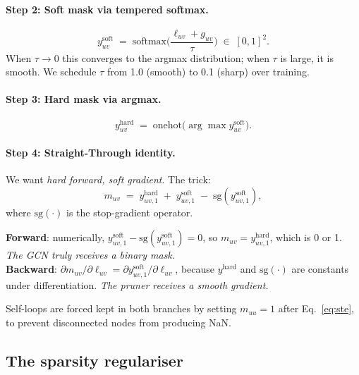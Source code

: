 \documentclass[11pt,a4paper]{article}
\begin{document}
\paragraph{Step 2: Soft mask via tempered softmax.}
\begin{equation}
y^{\text{soft}}_{uv} \;=\; \mathrm{softmax}\!\Bigg(\frac{\ell_{uv} + g_{uv}}{\tau}\Bigg)
\;\in\; [0,1]^{2}.
\label{eq:ysoft}
\end{equation}
When $\tau \to 0$ this converges to the argmax distribution; when
$\tau$ is large, it is smooth. We schedule $\tau$ from 1.0 (smooth) to
0.1 (sharp) over training.

\paragraph{Step 3: Hard mask via argmax.}
\begin{equation}
y^{\text{hard}}_{uv} \;=\; \mathrm{onehot}\!\big(\arg\max y^{\text{soft}}_{uv}\big).
\label{eq:yhard}
\end{equation}

\paragraph{Step 4: Straight-Through identity.}
We want \emph{hard forward, soft gradient}. The trick:
\begin{equation}
m_{uv} \;=\; y^{\text{hard}}_{uv,1}
\;+\; y^{\text{soft}}_{uv,1}
\;-\; \mathrm{sg}(y^{\text{soft}}_{uv,1}),
\label{eq:ste}
\end{equation}
where $\mathrm{sg}(\cdot)$ is the stop-gradient operator.

\begin{keybox}
\textbf{Forward}: numerically,
$y^{\text{soft}}_{uv,1} - \mathrm{sg}(y^{\text{soft}}_{uv,1}) = 0$,
so $m_{uv} = y^{\text{hard}}_{uv,1}$, which is 0 or 1. \emph{The GCN
truly receives a binary mask.}\\
\textbf{Backward}: $\partial m_{uv}/\partial \ell_{uv}
= \partial y^{\text{soft}}_{uv,1}/\partial \ell_{uv}$, because
$y^{\text{hard}}$ and $\mathrm{sg}(\cdot)$ are constants under
differentiation. \emph{The pruner receives a smooth gradient.}
\end{keybox}

Self-loops are forced kept in both branches by setting $m_{uu} = 1$
after Eq.~\eqref{eq:ste}, to prevent disconnected nodes from producing
NaN.

\subsection{The sparsity regulariser}
\end{document}
